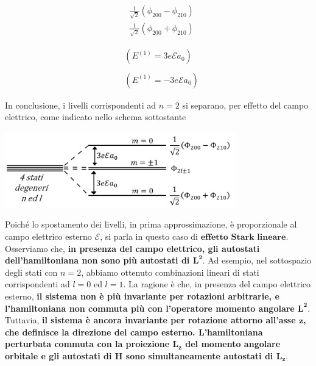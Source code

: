 \begin{center}
\begin{minipage}[c]{0.40\textwidth}
\centering
\begin{equation} \nonumber
\begin{split}
& \frac{1}{\sqrt{2}} \left( \phi_{200}-\phi_{210} \right) \\
& \frac{1}{\sqrt{2}} \left( \phi_{200}+\phi_{210} \right)
\end{split}
\end{equation}
\end{minipage}
\begin{minipage}{0.50\textwidth}
\centering
\begin{equation} 
\begin{split}
& \left( E^{(1)}=3e\mathcal{E}a_0 \right) \\
& \\
& \left( E^{(1)}=-3e\mathcal{E}a_0 \right)
\end{split}
\end{equation}
\end{minipage}
\end{center}
In conclusione, i livelli corrispondenti ad $n=2$ si separano, per effetto del campo elettrico, come indicato nello schema sottostante
\begin{center}
\includegraphics[width=10cm]{immagini/cap_23/fig23_1.png}
\end{center}
Poiché lo spostamento dei livelli, in prima approssimazione, è proporzionale al campo elettrico esterno $\mathcal{E}$, si parla in questo caso di $\textbf{effetto Stark lineare}$.\\
Osserviamo che, \textbf{in presenza del campo elettrico, gli autostati dell'hamiltoniana non sono più autostati di $\boldsymbol{L^2}$}. Ad esempio, nel sottospazio degli stati con $n=2$, abbiamo ottenuto combinazioni lineari di stati corrispondenti ad $l=0$ ed $l=1$. La ragione è che, in presenza del campo elettrico esterno, \textbf{il sistema non è più invariante per rotazioni arbitrarie, e l'hamiltoniana non commuta più con l'operatore momento angolare $\boldsymbol{L^2}$}.\\
Tuttavia, \textbf{il sistema è ancora invariante per rotazione attorno all'asse $\boldsymbol{z}$, che definisce la direzione del campo esterno. L'hamiltoniana perturbata commuta con la proiezione $\boldsymbol{L_z}$ del momento angolare orbitale e gli autostati di $\boldsymbol{H}$ sono simultaneamente autostati di $\boldsymbol{L_z}$}.